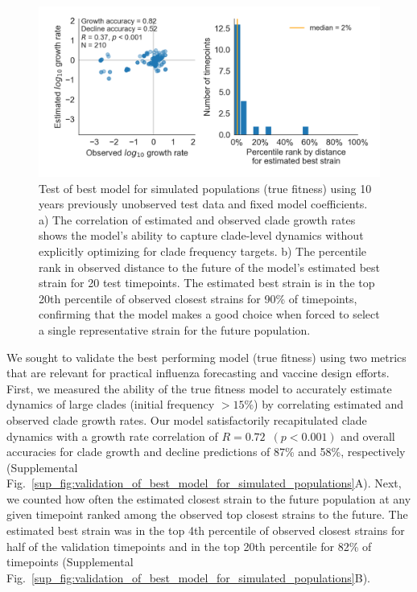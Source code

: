 \begin{figure}[ht]
  \begin{center}
  \includegraphics[width=\textwidth]{figures/test-of-best-model-for-simulated-populations.png}
  \caption{
  Test of best model for simulated populations (true fitness) using 10 years previously unobserved test data and fixed model coefficients.
  a) The correlation of estimated and observed clade growth rates shows the model's ability to capture clade-level dynamics without explicitly optimizing for clade frequency targets.
  b) The percentile rank in observed distance to the future of the model's estimated best strain for 20 test timepoints.
  The estimated best strain is in the top 20th percentile of observed closest strains for 90\% of timepoints, confirming that the model makes a good choice when forced to select a single representative strain for the future population.
  }
  \label{fig:test_of_best_model_for_simulated_populations}
  \end{center}
\end{figure}

We sought to validate the best performing model (true fitness) using two metrics that are relevant for practical influenza forecasting and vaccine design efforts.
First, we measured the ability of the true fitness model to accurately estimate dynamics of large clades (initial frequency $>15\%$) by correlating estimated and observed clade growth rates.
Our model satisfactorily recapitulated clade dynamics with a growth rate correlation of $R = 0.72$~$(p < 0.001)$ and overall accuracies for clade growth and decline predictions of 87\% and 58\%, respectively (Supplemental Fig.~\ref{sup_fig:validation_of_best_model_for_simulated_populations}A).
Next, we counted how often the estimated closest strain to the future population at any given timepoint ranked among the observed top closest strains to the future.
The estimated best strain was in the top 4th percentile of observed closest strains for half of the validation timepoints and in the top 20th percentile for 82\% of timepoints (Supplemental Fig.~\ref{sup_fig:validation_of_best_model_for_simulated_populations}B).

